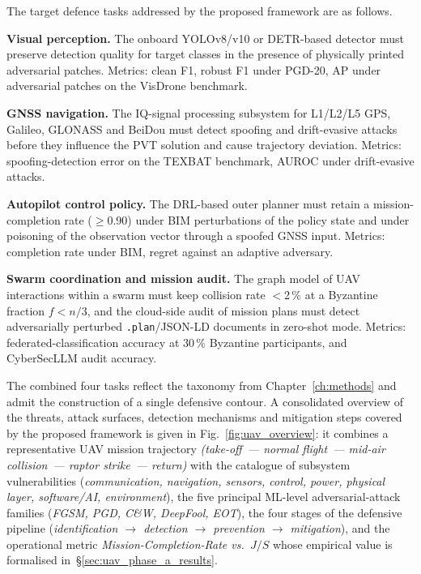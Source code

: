 The target defence tasks addressed by the proposed framework are as
follows.

\noindent\textbf{Visual perception.} The onboard YOLOv8/v10 or
DETR-based detector must preserve detection quality for target classes
in the presence of physically printed adversarial patches. Metrics:
clean F1, robust F1 under PGD-20, AP under adversarial patches on the
VisDrone benchmark.

\noindent\textbf{GNSS navigation.} The IQ-signal processing subsystem
for L1/L2/L5 GPS, Galileo, GLONASS and BeiDou must detect spoofing
and drift-evasive attacks before they influence the PVT solution and
cause trajectory deviation. Metrics: spoofing-detection error on the
TEXBAT benchmark, AUROC under drift-evasive attacks.

\noindent\textbf{Autopilot control policy.} The DRL-based outer
planner must retain a mission-completion rate ($\ge$0.90) under BIM
perturbations of the policy state and under poisoning of the
observation vector through a spoofed GNSS input. Metrics: completion
rate under BIM, regret against an adaptive adversary.

\noindent\textbf{Swarm coordination and mission audit.} The graph
model of UAV interactions within a swarm must keep collision rate
$<$2\,\% at a Byzantine fraction $f<n/3$, and the cloud-side audit of
mission plans must detect adversarially perturbed
\texttt{.plan}/JSON-LD documents in zero-shot mode. Metrics:
federated-classification accuracy at 30\,\% Byzantine participants,
and \textsf{CyberSecLLM} audit accuracy.

The combined four tasks reflect the taxonomy from
Chapter~\ref{ch:methods} and admit the construction of a single
defensive contour. A consolidated overview of the threats, attack
surfaces, detection mechanisms and mitigation steps covered by the
proposed framework is given in Fig.~\ref{fig:uav_overview}: it
combines a representative UAV mission trajectory \emph{(take-off~---
normal flight~--- mid-air collision~--- raptor strike~--- return)}
with the catalogue of subsystem vulnerabilities (\emph{communication,
navigation, sensors, control, power, physical layer, software/AI,
environment}), the five principal ML-level adversarial-attack
families (\emph{FGSM, PGD, C\&W, DeepFool, EOT}), the four stages of
the defensive pipeline (\emph{identification $\to$ detection $\to$
prevention $\to$ mitigation}), and the operational metric
\emph{Mission-Completion-Rate vs.~$J/S$} whose empirical value is
formalised in~\S\ref{sec:uav_phase_a_results}.

